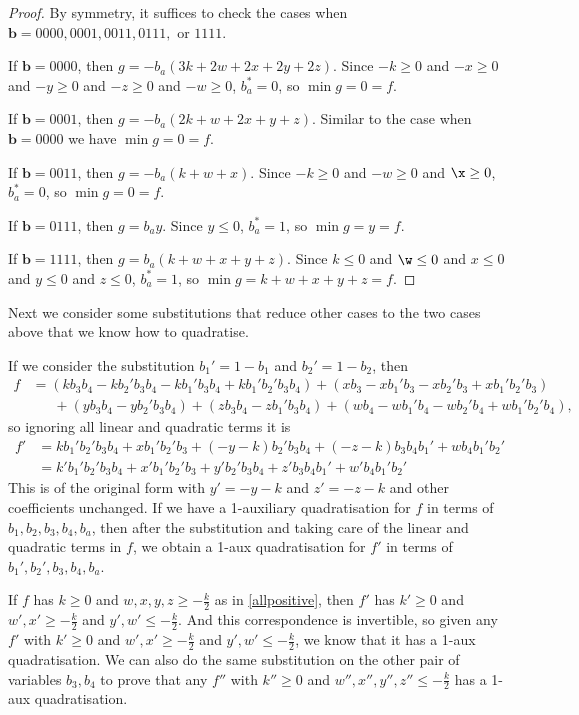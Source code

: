\documentclass[11pt]{scrartcl}
\newcommand{\vc}[1]{\boldsymbol{#1}}
\begin{document}
\begin{proof}
By symmetry, it suffices to check the cases when $\vc b = 0000, 0001, 0011, 0111, $ or $1111$.

If $\vc b = 0000$, then $g = -b_a(3k + 2w + 2x + 2y + 2z)$. Since $-k \ge 0$ and $-x \ge 0$ and $-y \ge 0$ and $-z \ge 0$ and $-w \ge 0$, $b_a^* = 0$, so $\min g = 0 = f$.

If $\vc b = 0001$, then $g = -b_a(2k + w + 2x + y + z)$. Similar to the case when $\vc b = 0000$ we have $\min g = 0 = f$.

If $\vc b = 0011$, then $g = -b_a(k + w + x)$. Since $-k \ge 0$ and $-w \ge 0$ and $\x \ge 0$, $b_a^* = 0$, so $\min g = 0 = f$.

If $\vc b = 0111$, then $g = b_ay$. Since $y \le 0$, $b_a^* = 1$, so $\min g = y = f$.

If $\vc b = 1111$, then $g = b_a(k + w + x + y + z)$. Since $k \le 0$ and $\w \le 0$ and $x \le 0$ and $y \le 0$ and $z \le 0$, $b_a^* = 1$, so $\min g = k + w + x + y + z  = f$.

\end{proof}

Next we consider some substitutions that reduce other cases to the two cases above that we know how to quadratise.

If we consider the substitution $b_1' = 1-b_1$ and $b_2' = 1-b_2$, then
\begin{align*} 
	f &= (kb_3b_4 - kb_2'b_3b_4 -kb_1'b_3b_4 + kb_1'b_2'b_3b_4) + (xb_3 - xb_1'b_3 - xb_2'b_3 +  xb_1'b_2'b_3)  \\ 
	&\phantom{=}\ + (yb_3b_4 - yb_2'b_3b_4) + (zb_3b_4 - zb_1'b_3b_4) + (wb_4 - wb_1'b_4 - wb_2'b_4 + wb_1'b_2'b_4),\end{align*}
so ignoring all linear and quadratic terms it is
\begin{align*} f' &= kb_1'b_2'b_3b_4 + xb_1'b_2'b_3 + (-y-k)b_2'b_3b_4 + (-z-k)b_3b_4b_1' + wb_4b_1'b_2'\\ 
	&=k'b_1'b_2'b_3b_4 + x'b_1'b_2'b_3 + y'b_2'b_3b_4 + z'b_3b_4b_1' + w'b_4b_1'b_2'
\end{align*}
This is of the original form with $y'=-y-k$ and $z'=-z-k$ and other coefficients unchanged. 
If we have a 1-auxiliary quadratisation for $f$ in terms of $b_1, b_2, b_3, b_4, b_a$, 
then after the substitution and taking care of the linear and quadratic terms in $f$, we obtain a 1-aux quadratisation for $f'$ in terms of $b_1', b_2', b_3, b_4, b_a$.

If $f$ has $k \ge 0$ and $w, x, y , z \ge -\frac{k}{2}$ as in \ref{allpositive}, then $f'$ has $k' \ge 0$ and $w', x' \ge -\frac{k}{2}$ and $y', w' \le -\frac{k}{2}$. And this correspondence is invertible, so given any $f'$ with  $k' \ge 0$ and $w', x' \ge -\frac{k}{2}$ and $y', w' \le -\frac{k}{2}$,
we know that it has a 1-aux quadratisation. We can also do the same substitution on the other pair of variables $b_3, b_4$ to prove that any $f''$ with $k'' \ge 0$ and $w'', x'', y'', z'' \le -\frac{k}{2}$ has a 1-aux quadratisation. 
\end{document}
